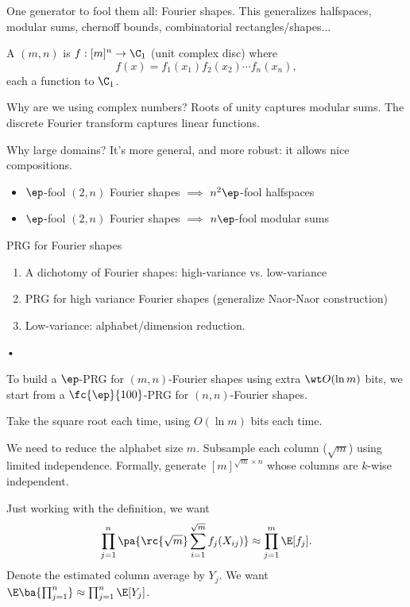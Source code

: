 One generator to fool them all: Fourier shapes. This generalizes halfspaces, modular sums, chernoff bounds, combinatorial rectangles/shapes...

\begin{df}
A $(m,n)$  is $f:[m]^n\to \C_1$ (unit complex disc) where
\[
f(x)=f_1(x_1)f_2(x_2)\cdots f_n(x_n),
\]
each a function to $\C_1$. 
\end{df}
Why are we using complex numbers? Roots of unity captures modular sums. The discrete Fourier transform captures linear functions. 

Why large domains? It's more general, and more robust: it allows nice compositions.


\begin{itemize}
\item
$\ep$-fool $(2,n)$ Fourier shapes $\implies$ $n^2\ep$-fool halfspaces
\item
$\ep$-fool $(2,n)$ Fourier shapes $\implies$ $n\ep$-fool modular sums
\end{itemize}

PRG for Fourier shapes
\begin{enumerate}
\item
A dichotomy of Fourier shapes: high-variance vs. low-variance
\item
PRG for high variance Fourier shapes (generalize Naor-Naor construction)
\item
Low-variance: alphabet/dimension reduction.
\end{enumerate}•

To build a $\ep$-PRG for $(m,n)$-Fourier shapes using extra $\wt O(\ln m)$ bits, we start from a $\fc{\ep}{100}$-PRG for $(n,n)$-Fourier shapes.

Take the square root each time, using $O(\ln m)$ bits each time.

We need to reduce the alphabet size $m$. Subsample each column ($\sqrt m$) using limited independence. 
Formally, generate $[m]^{\sqrt m\times n}$ whose columns are $k$-wise independent.


Just working with the definition, we want
\[
\prod_{j=1}^n \pa{\rc{\sqrt m}\sum_{i=1}^{\sqrt m} f_j(X_{ij})}\approx \prod_{j=1}^m \E[f_j].
\]
Denote the estimated column average by $Y_j$. We want $\E\ba{\prod_{j=1}^n}\approx \prod_{j=1}^n \E[Y_j]$.

